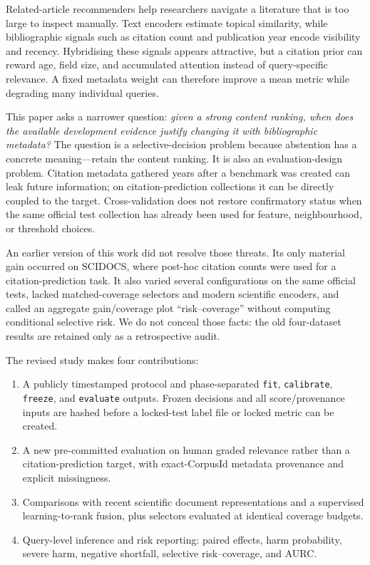 \documentclass[11pt]{article}
\newcommand{\code}[1]{\texttt{#1}}
\begin{document}
Related-article recommenders help researchers navigate a literature that is too large
to inspect manually.  Text encoders estimate topical similarity, while bibliographic
signals such as citation count and publication year encode visibility and recency.
Hybridising these signals appears attractive, but a citation prior can reward age,
field size, and accumulated attention instead of query-specific relevance.  A fixed
metadata weight can therefore improve a mean metric while degrading many individual
queries.

This paper asks a narrower question: \emph{given a strong content ranking, when does
the available development evidence justify changing it with bibliographic metadata?}
The question is a selective-decision problem because abstention has a concrete
meaning---retain the content ranking.  It is also an evaluation-design problem.
Citation metadata gathered years after a benchmark was created can leak future
information; on citation-prediction collections it can be directly coupled to the
target.  Cross-validation does not restore confirmatory status when the same official
test collection has already been used for feature, neighbourhood, or threshold
choices.

An earlier version of this work did not resolve those threats.  Its only material gain
occurred on SCIDOCS, where post-hoc citation counts were used for a citation-prediction
task.  It also varied several configurations on the same official tests, lacked
matched-coverage selectors and modern scientific encoders, and called an aggregate
gain/coverage plot ``risk--coverage'' without computing conditional selective risk.
We do not conceal those facts: the old four-dataset results are retained only as a
retrospective audit.

The revised study makes four contributions:

\begin{enumerate}
  \item A publicly timestamped protocol and phase-separated
  \code{fit}, \code{calibrate}, \code{freeze}, and \code{evaluate} outputs.  Frozen
  decisions and all score/provenance inputs are hashed before a locked-test label file
  or locked metric can be created.
  \item A new pre-committed evaluation on human graded relevance rather than a
  citation-prediction target, with exact-CorpusId metadata provenance and explicit
  missingness.
  \item Comparisons with recent scientific document representations and a supervised
  learning-to-rank fusion, plus selectors evaluated at identical coverage budgets.
  \item Query-level inference and risk reporting: paired effects, harm probability,
  severe harm, negative shortfall, selective risk--coverage, and AURC.
\end{enumerate}
\end{document}
